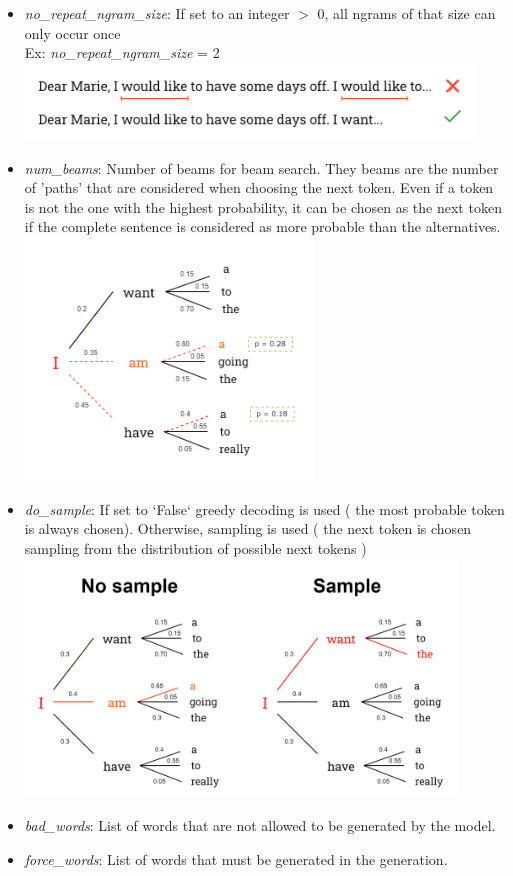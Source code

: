 \begin{itemize}
    \item \textit{no\_repeat\_ngram\_size}: If set to an integer $>$ 0, all ngrams of that size can only occur once \\
    Ex: \textit{no\_repeat\_ngram\_size} = 2 \\
    \includegraphics[width=0.94\textwidth]{images/no_ngram_thesis.drawio.png}

    \item \textit{num\_beams}: Number of beams for beam search. They beams are the number of 'paths' that are considered when choosing the next token. Even if a token is not the one with the highest probability, it can be chosen as the next token if the complete sentence is considered as more probable than the alternatives. \\
    \includegraphics[width=0.6\textwidth]{images/num_beams.drawio.png}

    \item \textit{do\_sample}: If set to `False` greedy decoding is used ( the most probable token is always chosen). Otherwise, sampling is used ( the next token is chosen sampling from the distribution of possible next tokens )
    \includegraphics[width=0.90\textwidth]{images/do_sample.drawio.png}

    \item \textit{bad\_words}: List of words that are not allowed to be generated by the model.
    \item \textit{force\_words}: List of words that must be generated in the generation.
    
\end{itemize}
